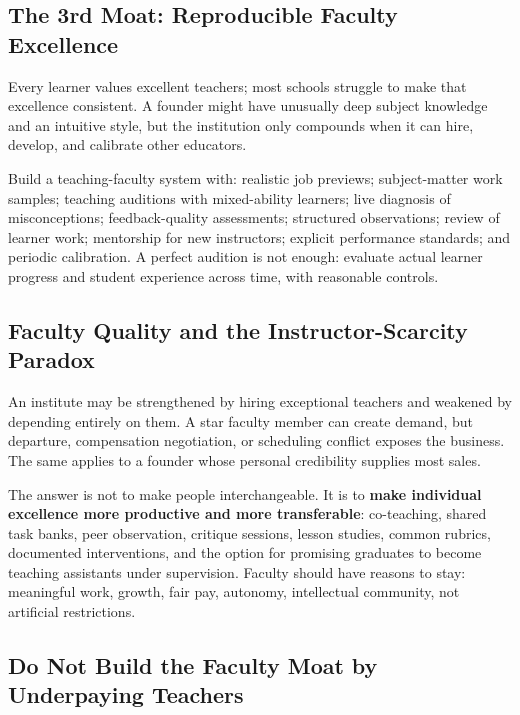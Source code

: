 \subsection{The 3rd Moat: Reproducible Faculty Excellence}
\label{sec:third_moat_reproducible_faculty}

Every learner values excellent teachers; most schools struggle to make that excellence consistent. A founder might have unusually deep subject knowledge and an intuitive style, but the institution only compounds when it can hire, develop, and calibrate other educators.

Build a teaching-faculty system with: realistic job previews; subject-matter work samples; teaching auditions with mixed-ability learners; live diagnosis of misconceptions; feedback-quality assessments; structured observations; review of learner work; mentorship for new instructors; explicit performance standards; and periodic calibration. A perfect audition is not enough: evaluate actual learner progress and student experience across time, with reasonable controls.

\subsection{Faculty Quality and the Instructor-Scarcity Paradox}
\label{sec:faculty_scarcity_paradox}

An institute may be strengthened by hiring exceptional teachers and weakened by depending entirely on them. A star faculty member can create demand, but departure, compensation negotiation, or scheduling conflict exposes the business. The same applies to a founder whose personal credibility supplies most sales.

The answer is not to make people interchangeable. It is to \textbf{make individual excellence more productive and more transferable}: co-teaching, shared task banks, peer observation, critique sessions, lesson studies, common rubrics, documented interventions, and the option for promising graduates to become teaching assistants under supervision. Faculty should have reasons to stay: meaningful work, growth, fair pay, autonomy, intellectual community, not artificial restrictions.

\subsection{Do Not Build the Faculty Moat by Underpaying Teachers}
\label{sec:dont_underpay_teachers}

